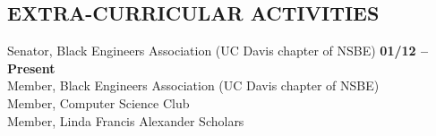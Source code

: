 \documentclass[line, letterpaper, 10pt]{res}
\begin{document}
\begin{resume}
\section{EXTRA-CURRICULAR ACTIVITIES}
    Senator, Black Engineers Association (UC Davis chapter of NSBE) \hfill {\bf 01/12 -- Present} \\
    Member, Black Engineers Association (UC Davis chapter of NSBE) \\
    Member, Computer Science Club \\
    Member, Linda Francis Alexander Scholars \\


\end{resume}
\end{document}
